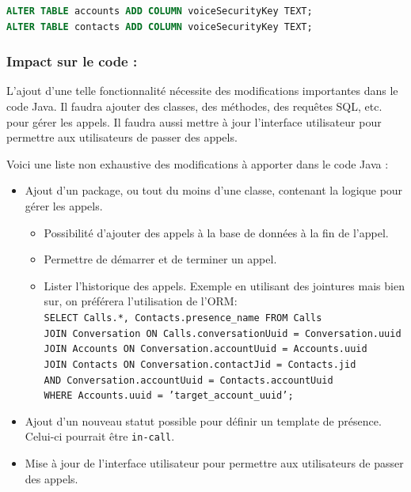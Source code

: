 \documentclass[a4paper,11pt]{article}
\begin{document}
\begin{lstlisting}[language=SQL]
ALTER TABLE accounts ADD COLUMN voiceSecurityKey TEXT;
ALTER TABLE contacts ADD COLUMN voiceSecurityKey TEXT;
\end{lstlisting}

\subsubsection*{Impact sur le code :}

L'ajout d'une telle fonctionnalité nécessite des modifications importantes dans le code Java. Il faudra ajouter des classes, des méthodes, des requêtes SQL, etc. pour gérer les appels. Il faudra aussi mettre à jour l'interface utilisateur pour permettre aux utilisateurs de passer des appels.

Voici une liste non exhaustive des modifications à apporter dans le code Java :
\begin{itemize}
	\item Ajout d'un package, ou tout du moins d'une classe, contenant la logique pour gérer les appels.
	\begin{itemize}
		\item Possibilité d'ajouter des appels à la base de données à la fin de l'appel. 
		\item Permettre de démarrer et de terminer un appel.
		\item Lister l'historique des appels. Exemple en utilisant des jointures mais bien sur, on préférera l'utilisation de l'ORM:\\
			\texttt{SELECT Calls.*, Contacts.presence\_name FROM Calls}\\
			\texttt{JOIN Conversation ON Calls.conversationUuid = Conversation.uuid}\\
			\texttt{JOIN Accounts ON Conversation.accountUuid = Accounts.uuid}\\
			\texttt{JOIN Contacts ON Conversation.contactJid = Contacts.jid}\\
			\texttt{AND Conversation.accountUuid = Contacts.accountUuid}\\
			\texttt{WHERE Accounts.uuid = 'target\_account\_uuid';}
	\end{itemize}
	\item Ajout d'un nouveau statut possible pour définir un template de présence. Celui-ci pourrait être \texttt{in-call}.
	\item Mise à jour de l'interface utilisateur pour permettre aux utilisateurs de passer des appels.
\end{itemize}
\end{document}
